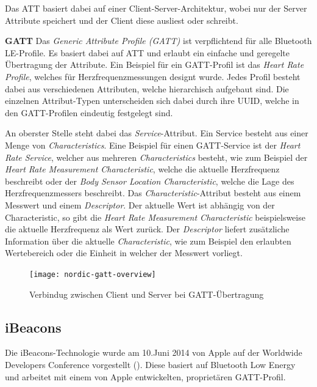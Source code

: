 Das ATT basiert dabei auf einer Client-Server-Architektur, wobei nur der Server Attribute speichert und der Client diese ausliest oder schreibt.

\textbf{GATT}
Das \emph{Generic Attribute Profile (GATT)} ist verpflichtend für alle Bluetooth LE-Profile. Es basiert dabei auf ATT und erlaubt ein einfache und geregelte Übertragung der Attribute. Ein Beispiel für ein GATT-Profil ist das \emph{Heart Rate Profile}, welches für Herzfrequenzmessungen designt wurde.
Jedes Profil besteht dabei aus verschiedenen Attributen, welche hierarchisch aufgebaut sind.
Die einzelnen Attribut-Typen unterscheiden sich dabei durch ihre UUID, welche in den GATT-Profilen eindeutig festgelegt sind.

An oberster Stelle steht dabei das \emph{Service}-Attribut. Ein Service besteht aus einer Menge von \emph{Characteristics}. Eine Beispiel für einen GATT-Service ist der \emph{Heart Rate Service}, welcher aus mehreren \emph{Characteristics} besteht, wie zum Beispiel der \emph{Heart Rate Measurement Characteristic}, welche die aktuelle Herzfrequenz beschreibt oder der \emph{Body Sensor Location Characteristic}, welche die Lage des Herzfrequenzmessers beschreibt. 
Das \emph{Characteristic}-Attribut besteht aus einem Messwert und einem \emph{Descriptor}. Der aktuelle Wert ist abhängig von der Characteristic, so gibt die \emph{Heart Rate Measurement Characteristic} beispielsweise die aktuelle Herzfrequenz als Wert zurück. 
Der \emph{Descriptor} liefert zusätzliche Information über die aktuelle \emph{Characteristic}, wie zum Beispiel den erlaubten Wertebereich oder die Einheit in welcher der Messwert vorliegt.

\begin{figure}[htb!]
		\centering
	\texttt{[image: nordic-gatt-overview]}
	\caption{Verbindug zwischen Client und Server bei GATT-Übertragung}
	\label{nordic-gatt-overview}
	\end{figure}


\subsection{iBeacons}
\label{sec:technologies:bluetoothLE:ibeacons}
Die iBeacons-Technologie wurde am 10.Juni 2014 von Apple auf der Worldwide Developers Conference vorgestellt (\citet{appleinsideribeacons}). 
Diese basiert auf Bluetooth Low Energy und arbeitet mit einem von Apple entwickelten, proprietären GATT-Profil.

